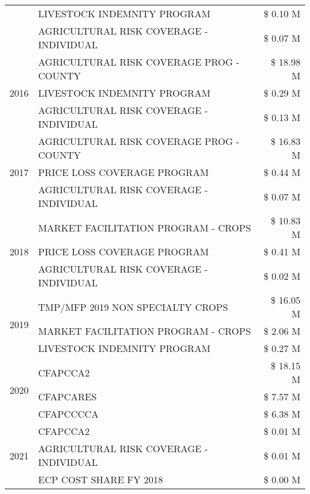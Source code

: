 \begin{tabular}{llr}
 & LIVESTOCK INDEMNITY PROGRAM & \$ 0.10 M \\
 & AGRICULTURAL RISK COVERAGE - INDIVIDUAL & \$ 0.07 M \\
\cline{1-3}
\multirow[t]{3}{*}{2016} & AGRICULTURAL RISK COVERAGE PROG - COUNTY & \$ 18.98 M \\
 & LIVESTOCK INDEMNITY PROGRAM & \$ 0.29 M \\
 & AGRICULTURAL RISK COVERAGE - INDIVIDUAL & \$ 0.13 M \\
\cline{1-3}
\multirow[t]{3}{*}{2017} & AGRICULTURAL RISK COVERAGE PROG - COUNTY & \$ 16.83 M \\
 & PRICE LOSS COVERAGE PROGRAM & \$ 0.44 M \\
 & AGRICULTURAL RISK COVERAGE - INDIVIDUAL & \$ 0.07 M \\
\cline{1-3}
\multirow[t]{3}{*}{2018} & MARKET FACILITATION PROGRAM - CROPS & \$ 10.83 M \\
 & PRICE LOSS COVERAGE PROGRAM & \$ 0.41 M \\
 & AGRICULTURAL RISK COVERAGE - INDIVIDUAL & \$ 0.02 M \\
\cline{1-3}
\multirow[t]{3}{*}{2019} & TMP/MFP 2019 NON SPECIALTY CROPS & \$ 16.05 M \\
 & MARKET FACILITATION PROGRAM - CROPS & \$ 2.06 M \\
 & LIVESTOCK INDEMNITY PROGRAM & \$ 0.27 M \\
\cline{1-3}
\multirow[t]{3}{*}{2020} & CFAPCCA2 & \$ 18.15 M \\
 & CFAPCARES & \$ 7.57 M \\
 & CFAPCCCCA & \$ 6.38 M \\
\cline{1-3}
\multirow[t]{3}{*}{2021} & CFAPCCA2 & \$ 0.01 M \\
 & AGRICULTURAL RISK COVERAGE - INDIVIDUAL & \$ 0.01 M \\
 & ECP COST SHARE FY 2018 & \$ 0.00 M \\
\cline{1-3}
\bottomrule
\end{tabular}
